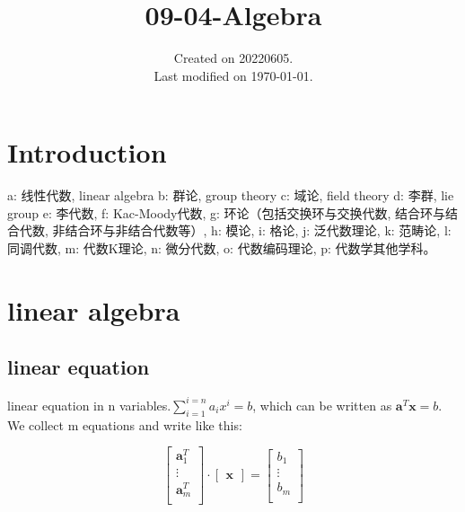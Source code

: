 \documentclass[UTF8]{../09-Mathematics}
\begin{document}
\title{09-04-Algebra}
\date{Created on 20220605.\\   Last modified on \today.}
\maketitle
\tableofcontents


\chapter{Introduction}





a: 线性代数, linear algebra
b: 群论, group theory
c: 域论, field theory
d: 李群, lie group
e: 李代数, 
f: Kac-Moody代数, 
g: 环论（包括交换环与交换代数, 结合环与结合代数, 非结合环与非结合代数等）, 
h: 模论, 
i: 格论, 
j: 泛代数理论, 
k: 范畴论, 
l: 同调代数, 
m: 代数K理论, 
n: 微分代数, 
o: 代数编码理论, 
p: 代数学其他学科。



\chapter{linear algebra}

\section{linear equation}



linear equation in n variables.$\sum_{i = 1}^{i=n}a_ix^i = b$, which can be written as $\boldsymbol a^T \boldsymbol x = b$. We collect m equations and write like this:

\begin{equation}
  \begin{bmatrix}
    \boldsymbol a^T_1 \\
    \vdots \\
    \boldsymbol a^T_m \\
  \end{bmatrix}
  \cdot
  \begin{bmatrix}
    \boldsymbol x
  \end{bmatrix}
  =
  \begin{bmatrix}
     b_1 \\
    \vdots \\
     b_m \\
  \end{bmatrix}
\end{equation}
\end{document}
